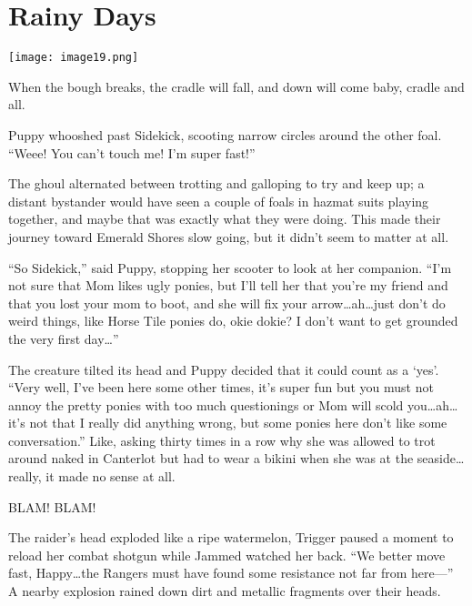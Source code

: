 \chapter{Rainy Days}

\texttt{[image: image19.png]}

\begin{intro}
    When the bough breaks, the cradle will fall, and down will come baby, cradle and all.
\end{intro}


Puppy whooshed past Sidekick, scooting narrow circles around the other foal. ``Weee! You can't touch me! I'm super fast!''

The ghoul alternated between trotting and galloping to try and keep up; a distant bystander would have seen a couple of foals in hazmat suits playing together, and maybe that was exactly what they were doing. This made their journey toward Emerald Shores slow going, but it didn't seem to matter at all.

``So Sidekick,'' said Puppy, stopping her scooter to look at her companion. ``I'm not sure that Mom likes ugly ponies, but I'll tell her that you're my friend and that you lost your mom to boot, and she will fix your arrow\dots ah\dots just don't do weird things, like Horse Tile ponies do, okie dokie? I don't want to get grounded the very first day\dots''

The creature tilted its head and Puppy decided that it could count as a `yes'. ``Very well, I've been here some other times, it's super fun but you must not annoy the pretty ponies with too much questionings or Mom will scold you\dots ah\dots it's not that I really did anything wrong, but some ponies here don't like some conversation.'' Like, asking thirty times in a row why she was allowed to trot around naked in Canterlot but had to wear a bikini when she was at the seaside\dots really, it made no sense at all.

\horizonline


BLAM! BLAM!

The raider's head exploded like a ripe watermelon, Trigger paused a moment to reload her combat shotgun while Jammed watched her back. ``We better move fast, Happy\dots the Rangers must have found some resistance not far from here---'' A nearby explosion rained down dirt and metallic fragments over their heads.

